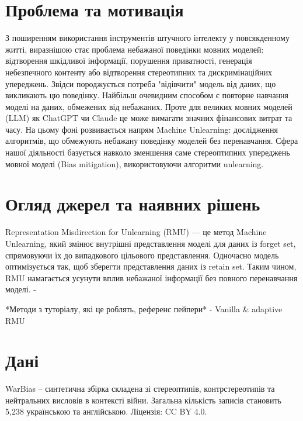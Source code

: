 \documentclass[ukrainian]{ucuproposal}
\begin{document}
\maketitlepage{}

\section{Проблема та мотивація}
З поширенням використання інструментів штучного інтелекту у повсякденному житті, виразнішою стає проблема небажаної поведінки мовних моделей: відтворення шкідливої інформації, порушення приватності, генерація небезпечного контенту або відтворення стереотипних та дискримінаційних упереджень. Звідси породжується потреба "відівчити" модель від даних, що викликають цю поведінку. Найбільш очевидним способом є повторне навчання моделі на даних, обмежених від небажаних. Проте для великих мовних моделей (LLM) як ChatGPT чи Claude це може вимагати значних фінансових витрат та часу. На цьому фоні розвивається напрям Machine Unlearning: дослідження алгоритмів, що обмежують небажану поведінку моделей без перенавчання. Сфера нашої діяльності базується навколо зменшення саме стереоптипних упереджень мовної моделі (Bias mitigation), використовуючи алгоритми unlearning.


\section{Огляд джерел та наявних рішень}
Representation Misdirection for Unlearning (RMU) \cite{pmlr-v235-li24bc} — це метод Machine Unlearning, який змінює внутрішні представлення моделі для даних із forget set, спрямовуючи їх до випадкового цільового представлення. Одночасно модель оптимізується так, щоб зберегти представлення даних із retain set. Таким чином, RMU намагається усунути вплив небажаної інформації без повного перенавчання моделі. 
- 


*Методи з туторіалу, які це роблять, референс пейпери*
- Vanilla \& adaptive RMU~\cite{pmlr-v235-li24bc}\cite{dang2025effects}

\section{Дані}
WarBias \cite{makovska_etal_2026_warbias} -- синтетична збірка складена зі стереоптипів, контрстереотипів та нейтральних висловів в контексті війни. Загальна кількість записів становить 5,238 українською та англійською. Ліцензія: CC BY 4.0.
\end{document}
